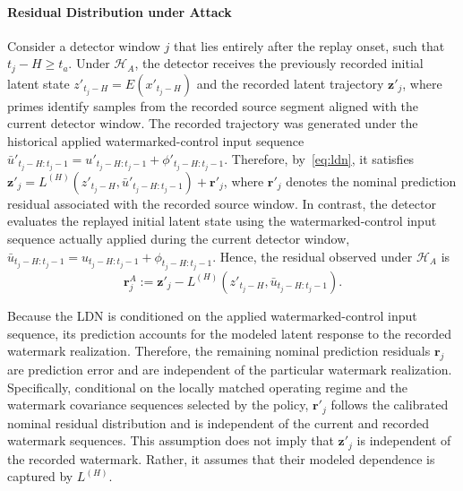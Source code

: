 \documentclass[letterpaper, 10 pt, conference]{ieeeconf}
\theoremstyle{plain}
\begin{document}
\paragraph{Residual Distribution under Attack}
Consider a detector window $j$ that lies entirely after the replay onset, such that $t_j-H\geq t_a$. Under $\mathcal{H}_A$, the detector receives the previously recorded initial latent state $z'_{t_j-H}=E(x'_{t_j-H})$ and the recorded latent trajectory $\mathbf{z}'_j$, where primes identify samples from the recorded source segment aligned with the current detector window. The recorded trajectory was generated under the historical applied watermarked-control input sequence $\bar{u}'_{t_j-H:t_j-1} = u'_{t_j-H:t_j-1} + \phi'_{t_j-H:t_j-1}$. Therefore, by~\eqref{eq:ldn}, it satisfies $\mathbf{z}'_j = L^{(H)} ( z'_{t_j-H}, \bar{u}'_{t_j-H:t_j-1} ) + \mathbf{r}'_j$, where $\mathbf r'_j$ denotes the nominal prediction residual associated with the recorded source window. In contrast, the detector evaluates the replayed initial latent state using the watermarked-control input sequence actually applied during the current detector window, $\bar{u}_{t_j-H:t_j-1} = u_{t_j-H:t_j-1}+ \phi_{t_j-H:t_j-1}$. Hence, the residual observed under $\mathcal{H}_A$ is
\begin{equation}\label{eq:attack_residual}
\mathbf{r}_j^A := \mathbf{z}'_j - L^{(H)} \left(z'_{t_j-H}, \bar{u}_{t_j-H:t_j-1} \right).
\end{equation}

Because the LDN is conditioned on the applied watermarked-control input sequence, its prediction accounts for the modeled latent response to the recorded watermark realization. Therefore, the remaining nominal prediction residuals $\mathbf{r}_j$ are prediction error and are independent of the particular watermark realization. Specifically, conditional on the locally matched operating regime and the watermark covariance sequences selected by the policy, $\mathbf{r}'_j$ follows the calibrated nominal residual distribution and is independent of the current and recorded watermark sequences. This assumption does not imply that $\mathbf{z}'_j$ is independent of the recorded watermark. Rather, it assumes that their modeled dependence is captured by $L^{(H)}$.
\end{document}
